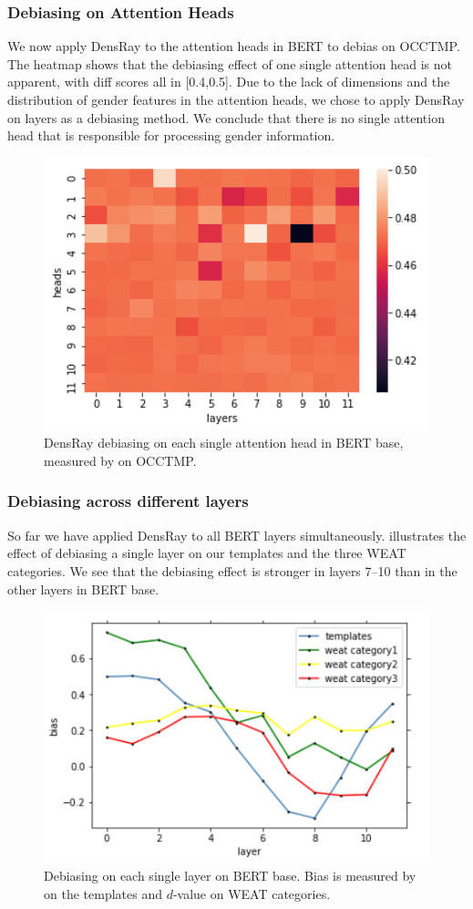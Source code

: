 \subsubsection{Debiasing on Attention Heads}
We now apply DensRay to the attention heads in BERT to debias on OCCTMP. The heatmap  shows that the debiasing effect of one single attention head is not apparent, with diff scores all in [0.4,0.5]. Due to the lack of dimensions and the distribution of gender features in the attention heads, we chose to apply DensRay on layers as a debiasing method. We conclude that there is no single attention head that is responsible for processing gender information.
\begin{figure}[h]
	\centering
	\includegraphics[width=0.5\linewidth]{heatmap_heads}
	\caption{DensRay debiasing on each single attention head in BERT base, measured by  on OCCTMP.}
\end{figure}

\subsubsection{Debiasing across different layers}
So far we have applied DensRay to all BERT layers simultaneously.
    illustrates the effect of
 debiasing a single  layer on our templates and the three
 WEAT categories. We see that the debiasing effect
is stronger in
layers 7--10  than in the other layers in BERT base.
\begin{figure}[h]
	\centering
	\includegraphics[width=0.5\linewidth]{layers_base}
	\caption{Debiasing on each single layer on BERT base. Bias is measured by  on the templates and $d$-value on WEAT categories.}
\end{figure}
